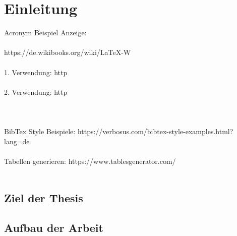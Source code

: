 \chapter{Einleitung}
Acronym Beispiel Anzeige:
\\\\
https://de.wikibooks.org/wiki/LaTeX-W%
\\\\
1. Verwendung:
\ac{http}
\\\\
2. Verwendung:
\ac{http}
\\\\
\\\\
BibTex Style Beispiele: https://verbosus.com/bibtex-style-examples.html?lang=de
\\\\
Tabellen generieren: https://www.tablesgenerator.com/
\\\\
\section{Ziel der Thesis} 
\section{Aufbau der Arbeit} 